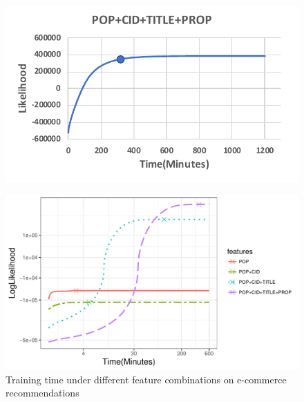 \begin{figure}[!htb]
  \label{fig:3feature}
\endminipage\quad
{}
  \includegraphics[width=\linewidth]{fig/4feature_lik}
  \label{fig:4feature}
\endminipage
\end{figure}

\begin{figure}[htb]
\includegraphics[width=0.9\columnwidth,height=0.5\columnwidth]{fig/Lik_time}
\caption{Training time under different feature combinations on e-commerce recommendations}
\label{fig:train_time_cmp}
\end{figure}

